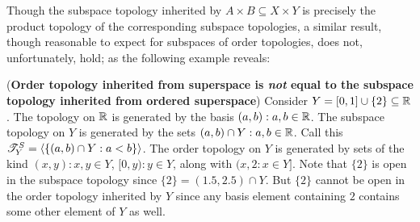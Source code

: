 \documentclass[main.tex]{subfiles}
\begin{document}
Though the subspace topology inherited by $A \times B \subseteq X \times Y$ is precisely the product topology of the corresponding subspace topologies, a similar result, though reasonable to expect for subspaces of order topologies, does not, unfortunately, hold; as the following example reveals:
\begin{example} (\textbf{Order topology inherited from superspace is \emph{not} equal to the subspace topology inherited from ordered superspace})
    Consider $Y=[0,1] \cup \{2\} \subseteq \mathbb R$. The topology on $\mathbb R$ is generated by the basis $(a,b):a,b \in \mathbb R$. The subspace topology on $Y$ is generated by the sets $(a,b) \cap Y: a,b \in \mathbb R$. Call this $\mathscr T^S_Y=\langle \{(a,b)\cap Y: a<b\}\rangle$.  The order topology on $Y$ is generated by sets of the kind $(x,y): x,y \in Y$, $[0,y): y \in Y$, along with $(x,2: x \in Y]$. Note that $\{2\}$ is open in the subspace topology since $\{2\}=(1.5,2.5) \cap Y$. But $\{2\}$ cannot be open in the order topology inherited by $Y$ since any basis element containing $2$ contains some other element of $Y$ as well. \end{example}
\end{document}
